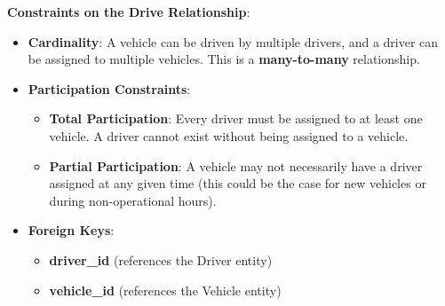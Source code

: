 \documentclass{article}
\begin{document}
\textbf{Constraints on the Drive Relationship}:
\begin{itemize}
	\item \textbf{Cardinality}: A vehicle can be driven by multiple drivers, and a driver can be assigned to multiple vehicles. This is a \textbf{many-to-many} relationship.
	\item \textbf{Participation Constraints}:
	\begin{itemize}
		\item \textbf{Total Participation}: Every driver must be assigned to at least one vehicle. A driver cannot exist without being assigned to a vehicle.
		\item \textbf{Partial Participation}: A vehicle may not necessarily have a driver assigned at any given time (this could be the case for new vehicles or during non-operational hours).
	\end{itemize}
	\item \textbf{Foreign Keys}: 
	\begin{itemize}
		\item \textbf{driver\_id} (references the Driver entity)
		\item \textbf{vehicle\_id} (references the Vehicle entity)
	\end{itemize}
\end{itemize}
\end{document}
